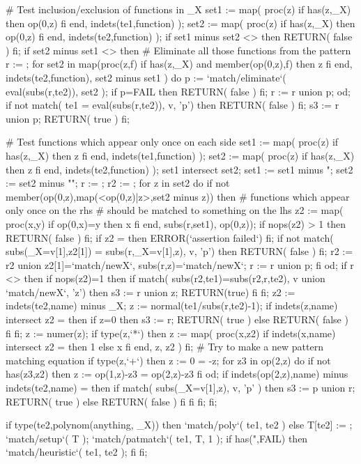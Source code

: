 # Test inclusion/exclusion of functions in _X
set1 := map( proc(z) if has(z,_X) then op(0,z) fi end, indets(te1,function) );
set2 := map( proc(z) if has(z,_X) then op(0,z) fi end, indets(te2,function) );
if set1 minus set2 <> {} then RETURN( false ) fi;
if set2 minus set1 <> {} then
    # Eliminate all those functions from the pattern
    r := {};
    for set2 in map(proc(z,f) if has(z,_X) and member(op(0,z),f) then z fi end,
			indets(te2,function), set2 minus set1 ) do
	p := `match/eliminate`( eval(subs(r,te2)), set2 );
	if p=FAIL then RETURN( false ) fi;
	r := r union p;
	od;
    if not match( te1 = eval(subs(r,te2)), v, 'p') then RETURN( false ) fi;
    s3 := r union p;  RETURN( true )
    fi;

# Test functions which appear only once on each side
set1 := map( proc(z) if has(z,_X) then z fi end, indets(te1,function) );
set2 := map( proc(z) if has(z,_X) then z fi end, indets(te2,function) );
set1 intersect set2;
set1 := set1 minus ";  set2 := set2 minus "";
r := {};
r2 := {};
for z in set2 do
    if not member(op(0,z),map(<op(0,z)|z>,set2 minus {z})) then
	# functions which appear only once on the rhs
	# should be matched to something on the lhs
	z2 := map( proc(x,y) if op(0,x)=y then x fi end,
		subs(r,set1), op(0,z));
	if nops(z2) > 1 then RETURN( false ) fi;
	if z2 = {} then ERROR(`assertion failed`) fi;
	if not match( subs(_X=v[1],z2[1]) = subs(r,_X=v[1],z), v, 'p') then
		RETURN( false ) fi;
	r2 := r2 union {z2[1]=`match/newX`, subs(r,z)=`match/newX`};
	r := r union p;
	fi
    od;
if r <> {} then
    if nops(z2)=1 then
	if match( subs(r2,te1)=subs(r2,r,te2), v union {`match/newX`}, 'z') 
	then
	    s3 := r union z;
	    RETURN(true)
	    fi
	fi;
    z2 := indets(te2,name) minus {_X};
    z := normal(te1/subs(r,te2)-1);
    if indets(z,name) intersect z2 = {} then
	if z=0 then s3 := r;  RETURN( true ) else RETURN( false ) fi fi;
    z := numer(z);
    if type(z,`*`) then
	z := map( proc(x,z2) if indets(x,name) intersect z2 = {} then
		1 else x fi end, z, z2 ) fi;
    # Try to make a new pattern matching equation
    if type(z,`+`) then
	z := 0 = -z;
	for z3 in op(2,z) do
	    if not has(z3,z2) then z := op(1,z)-z3 = op(2,z)-z3 fi od;
	if indets(op(2,z),name) minus indets(te2,name) = {} then
	    if match( subs(_X=v[1],z), v, 'p' ) then
		s3 := p union r;  RETURN( true ) else RETURN( false ) fi
	    fi
	fi;
    fi;

if type(te2,polynom(anything, _X)) then
    `match/poly`( te1, te2 )
else
    T[te2] := {};
    `match/setup`( T );
    `match/patmatch`( te1, T, 1 );
    if has(",FAIL) then
	`match/heuristic`( te1, te2 );
	fi
    fi;

